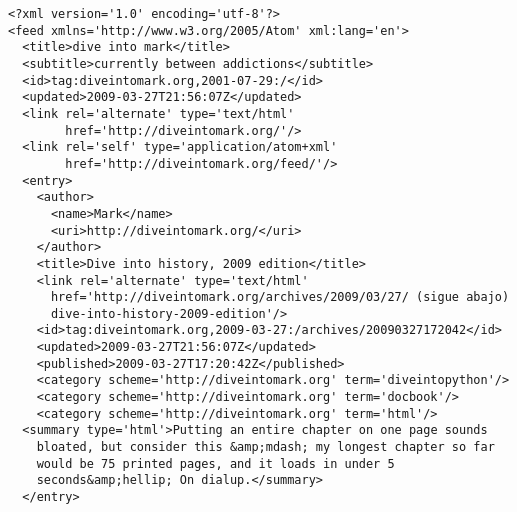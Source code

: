 \noindent\begin{minipage}{\textwidth}
\begin{lstlisting}[mathescape=True]
<?xml version='1.0' encoding='utf-8'?>
<feed xmlns='http://www.w3.org/2005/Atom' xml:lang='en'>
  <title>dive into mark</title>
  <subtitle>currently between addictions</subtitle>
  <id>tag:diveintomark.org,2001-07-29:/</id>
  <updated>2009-03-27T21:56:07Z</updated>
  <link rel='alternate' type='text/html' 
        href='http://diveintomark.org/'/>
  <link rel='self' type='application/atom+xml' 
        href='http://diveintomark.org/feed/'/>
  <entry>
    <author>
      <name>Mark</name>
      <uri>http://diveintomark.org/</uri>
    </author>
    <title>Dive into history, 2009 edition</title>
    <link rel='alternate' type='text/html'
      href='http://diveintomark.org/archives/2009/03/27/ (sigue abajo)
      dive-into-history-2009-edition'/>
    <id>tag:diveintomark.org,2009-03-27:/archives/20090327172042</id>
    <updated>2009-03-27T21:56:07Z</updated>
    <published>2009-03-27T17:20:42Z</published>
    <category scheme='http://diveintomark.org' term='diveintopython'/>
    <category scheme='http://diveintomark.org' term='docbook'/>
    <category scheme='http://diveintomark.org' term='html'/>
  <summary type='html'>Putting an entire chapter on one page sounds
    bloated, but consider this &amp;mdash; my longest chapter so far
    would be 75 printed pages, and it loads in under 5 
    seconds&amp;hellip; On dialup.</summary>
  </entry>
\end{lstlisting}
\end{minipage}
\newpage
